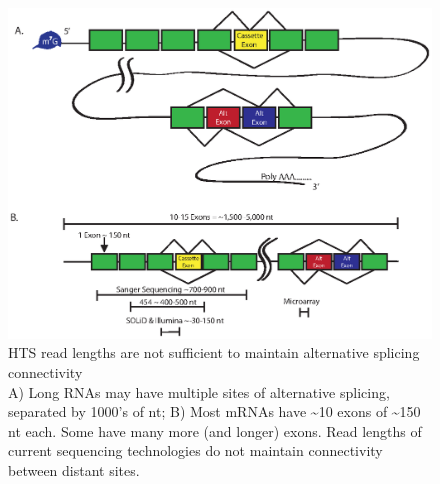     \begin{figure} %
      \centering
      \includegraphics{Figures/Intro/SeqLengths_and_Connectivity.eps}
      \caption[HTS read lengths are not sufficient to maintain alternative splicing connectivity]
      {
        HTS read lengths are not sufficient to maintain alternative splicing connectivity\\[0.25cm]
        A) Long RNAs may have multiple sites of alternative splicing, separated by 1000's of nt; B) Most mRNAs have \textasciitilde10 exons of \textasciitilde150 nt each. Some have many more (and longer) exons. Read lengths of current sequencing technologies do not maintain connectivity between distant sites.
        }
      \label{Intro:fig:NoConnectivityInHTSMethods}
      \end{figure}

